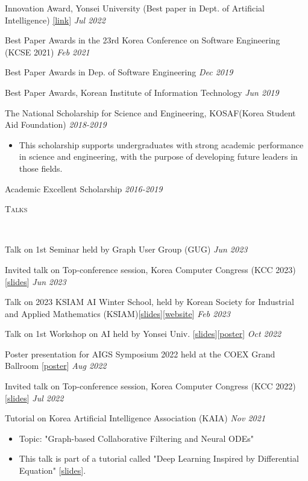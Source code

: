 \documentclass[10pt]{article}
\newenvironment{changemargin}[2]{
  \begin{list}{}{
    \setlength{\topsep}{0pt}
    \setlength{\leftmargin}{#1}
    \setlength{\rightmargin}{#2}
    \setlength{\listparindent}{\parindent}
    \setlength{\itemindent}{\parindent}
    \setlength{\parsep}{\parskip}
  }
  \item[]}{\end{list}
}
\newcommand{\lineover}{
	\begin{changemargin}{-0.05in}{-0.05in}
		\vspace*{-8pt}
		\hrulefill \\
		\vspace*{-2pt}
	\end{changemargin}
}
\newcommand{\header}[1]{
	\begin{changemargin}{-0.5in}{-0.5in}
		\scshape{#1}\\
  	\lineover
	\end{changemargin}
}
\newcommand{\award}[2]{
	{#1} \hfill \emph{#2}\\ \medskip
}
\newenvironment{body} {
	\vspace*{-16pt}
	\begin{changemargin}{-0.25in}{-0.5in}
  }
	{\end{changemargin}
}
\begin{document}
\begin{body}
	\vspace{14pt}

\award{Innovation Award, Yonsei University (Best paper in Dept. of Artificial Intelligence) \href{https://www.yonsei.ac.kr/ocx/news.jsp?mode=view&ar_seq=20220708141917269049&sr_volume=632&list_mode=list&sr_site=S&pager.offset=0&sr_cates=29}{[link]}}{Jul 2022}
\award{Best Paper Awards in the 23rd Korea Conference on Software Engineering (KCSE 2021)}{Feb 2021}
\award{Best Paper Awards in Dep. of Software Engineering}{Dec 2019}
\award{Best Paper Awards, Korean Institute of Information Technology}{Jun 2019}
\award{The National Scholarship for Science and Engineering, KOSAF(Korea Student Aid Foundation)}{2018-2019}
    \begin{itemize} \itemsep -0pt  %
      \item This scholarship supports undergraduates with strong academic performance in science and engineering, with the purpose of developing future leaders in those fields.
  	\end{itemize}
\award{Academic Excellent Scholarship}{2016-2019}
\end{body}

\medskip

\header{Talks}

\begin{body}
	\vspace{14pt}
\award{Talk on 1st Seminar held by Graph User Group (GUG)}{Jun 2023}
\award{Invited talk on Top-conference session, Korea Computer Congress (KCC 2023) [\href{https://www.dropbox.com/s/34h6pmr7ftdiuzr/BSPM-KCC23.pptx?dl=0}{slides}]}{Jun 2023}
\award{Talk on 2023 KSIAM AI Winter School, held by Korean Society for Industrial and Applied Mathematics (KSIAM)[\href{https://www.dropbox.com/s/p4sd5h40hcuxcob/KSIAM23-Tutorial-ODE-RecSys.pdf?dl=0}{slides}][\href{https://ksiam.org/Conference/ConferenceView.asp?AC=3&CODE=CD20230101&CpPage=\#CONF}{website}]}{Feb 2023}
\award{Talk on 1st Workshop on AI held by Yonsei Univ. [\href{https://www.dropbox.com/s/9au5xx13qa2l529/AAAI22_workshop.pdf?dl=0}{slides}][\href{https://www.dropbox.com/s/pibzd51d76zy907/AAAI22-Yonsei_AI_Workshop.pdf?dl=0}{poster}]}{Oct 2022}
\award{Poster presentation for AIGS Symposium 2022 held at the COEX Grand Ballroom [\href{https://www.dropbox.com/s/gfjsizak9s4cn9o/AAAI22-AIGS.pdf?dl=0}{poster}]}{Aug 2022}
\award{Invited talk on Top-conference session,  Korea Computer Congress (KCC 2022) [\href{https://www.dropbox.com/s/22d9d92ns8uv9qw/AAAI22_KCC22.pdf?dl=0}{slides}]}{Jul 2022}
\award{Tutorial on Korea Artificial Intelligence Association (KAIA)}{Nov 2021}
	\begin{itemize} \itemsep -0pt  %
        \item Topic: "Graph-based Collaborative Filtering and Neural ODEs"
		\item This talk is part of a tutorial called "Deep Learning Inspired by Differential Equation" [\href{https://www.dropbox.com/s/1xn8xhd6llmhblz/%5BKAIA2021%5DTutorial-LT-OCF.pdf?dl=0}{slides}].
  	\end{itemize}
\end{body}
\end{document}
